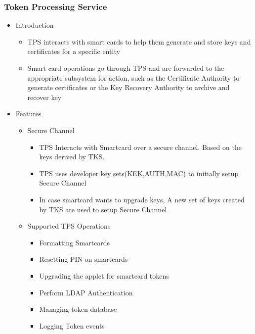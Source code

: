 \documentclass[12pt]{report}
\begin{document}
\subsubsection{Token Processing Service}
    \begin{itemize}
            \item Introduction
                \begin{itemize}
                    \item TPS interacts with smart cards to help them generate and store keys and certificates for a specific entity
                    \item Smart card operations go through TPS and are forwarded to the appropriate subsystem for action, 
                        such as the Certificate Authority to generate certificates or the Key Recovery Authority to archive and recover key
                \end{itemize}
            \item Features
                \begin{itemize}
                    \item Secure Channel
                        \begin{itemize}
                            \item TPS Interacts with Smartcard over a secure channel. Based on the keys derived
                                by TKS.
                            \item TPS uses developer key sets(KEK,AUTH,MAC) to initially setup Secure Channel
                            \item In case smartcard wants to upgrade keys, A new set of keys created by TKS are used
                                to setup Secure Channel
                        \end{itemize}
                    \item Supported TPS Operations
                        \begin{itemize}
                            \item Formatting Smartcards
                            \item Resetting PIN on smartcards
                            \item Upgrading the applet for smartcard tokens
                            \item Perform LDAP Authentication
                            \item Managing token database
                            \item Logging Token events

\end{itemize}
\end{itemize}
\end{itemize}
\end{document}
